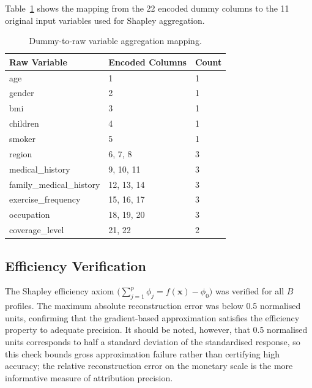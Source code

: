 Table~\ref{tab:dummy_mapping} shows the mapping from the 22 encoded dummy columns to the 11 original input variables used for Shapley aggregation.

\begin{table}[htbp]
\centering
\begin{tabular}{lll}
\toprule
\textbf{Raw Variable} & \textbf{Encoded Columns} & \textbf{Count} \\
\midrule
age                      & 1         & 1 \\
gender                   & 2         & 1 \\
bmi                      & 3         & 1 \\
children                 & 4         & 1 \\
smoker                   & 5         & 1 \\
region                   & 6, 7, 8   & 3 \\
medical\_history         & 9, 10, 11 & 3 \\
family\_medical\_history & 12, 13, 14 & 3 \\
exercise\_frequency      & 15, 16, 17 & 3 \\
occupation               & 18, 19, 20 & 3 \\
coverage\_level          & 21, 22    & 2 \\
\bottomrule
\end{tabular}
\caption{Dummy-to-raw variable aggregation mapping.}
\label{tab:dummy_mapping}
\end{table}

\subsection{Efficiency Verification}
\label{annexure:shap_efficiency}

The Shapley efficiency axiom $\bigl(\sum_{j=1}^{p} \phi_j = f(\mathbf{x}) - \phi_0\bigr)$ was verified for all $B$ profiles. The maximum absolute reconstruction error was below 0.5 normalised units, confirming that the gradient-based approximation satisfies the efficiency property to adequate precision. It should be noted, however, that 0.5 normalised units corresponds to half a standard deviation of the standardised response, so this check bounds gross approximation failure rather than certifying high accuracy; the relative reconstruction error on the monetary scale is the more informative measure of attribution precision.

